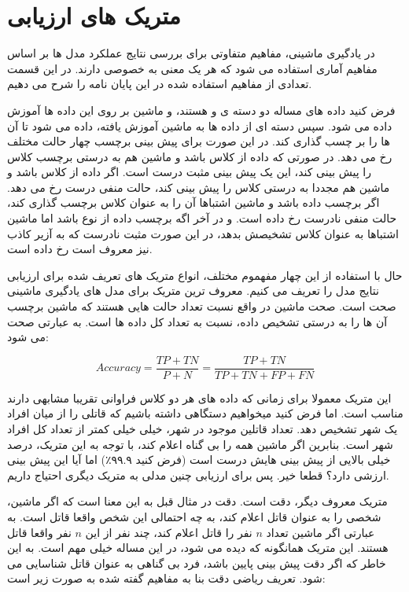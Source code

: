 \section{متریک های ارزیابی}

در یادگیری ماشینی، مفاهیم متفاوتی برای بررسی نتایج عملکرد مدل ها بر اساس مفاهیم آماری استفاده می شود که هر یک معنی به خصوصی دارند. در این قسمت تعدادی از مفاهیم استفاده شده در این پایان نامه را شرح می دهیم.

فرض کنید داده های مساله دو دسته ی
و
هستند، و ماشین بر روی این داده ها آموزش داده می شود.
سپس دسته ای از داده ها به ماشین آموزش یافته، داده می شود تا آن ها را بر چسب گذاری کند.
در این صورت برای پیش بینی برچسب
چهار حالت مختلف رخ می دهد.
در صورتی که داده از کلاس
باشد و ماشین هم به درستی برچسب کلاس
را پیش بینی کند، این یک پیش بینی مثبت درست
است.
اگر داده از کلاس
باشد و ماشین هم مجددا به درستی کلاس
را پیش بینی کند، حالت منفی درست
رخ می دهد.
اگر برچسب داده
باشد و ماشین اشتباها آن را به عنوان کلاس
برچسب گذاری کند، حالت منفی نادرست
رخ داده است.
و در آخر اگه برچسب داده از نوع
باشد اما ماشین اشتباها به عنوان کلاس
تشخیصش بدهد، در این صورت مثبت نادرست
که به آزیر کاذب نیز معروف است رخ داده است.

حال با استفاده از این چهار مفهموم مختلف، انواع متریک های تعریف شده برای ارزیابی نتایج مدل را تعریف می کنیم. معروف ترین متریک برای مدل های یادگیری ماشینی صحت
است. صحت ماشین در واقع نسبت تعداد حالت هایی هستند که ماشین برچسب آن ها را به درستی تشخیص داده، نسبت به تعداد کل داده ها است. به عبارتی صحت می شود:

\begin{equation}\label{eqn:acc}
Accuracy = \frac{TP+TN}{P+N} = \frac{TP+TN}{TP+TN+FP+FN}
\end{equation}

این متریک معمولا برای زمانی که داده های هر دو کلاس فراوانی تقریبا مشابهی دارند مناسب است. اما فرض کنید میخواهیم دستگاهی داشته باشیم که قاتلی را از میان افراد یک شهر تشخیص دهد. تعداد قاتلین موجود در شهر، خیلی خیلی کمتر از تعداد کل افراد شهر است. بنابرین اگر ماشین همه را بی گناه اعلام کند، با توجه به این متریک، درصد خیلی بالایی از پیش بینی هایش درست است‌ (فرض کنید ۹۹.۹٪)
اما آیا این پیش بینی ارزشی دارد؟ قطعا خیر. پس برای ارزیابی چنین مدلی به متریک دیگری احتیاج داریم.

متریک معروف دیگر، دقت
است. دقت در مثال قبل به این معنا است که اگر ماشین، شخصی را به عنوان قاتل اعلام کند، به چه احتمالی این شخص واقعا قاتل است. به عبارتی اگر ماشین تعداد
$n$
نفر را قاتل اعلام کند، چند نفر از این
$n$
نفر واقعا قاتل هستند. این متریک همانگونه که دیده می شود، در این مساله خیلی مهم است. به این خاطر که اگر دقت پیش بینی پایین باشد، فرد بی گناهی به عنوان قاتل شناسایی می شود. تعریف ریاضی دقت بنا به مفاهیم گفته شده به صورت زیر است:

